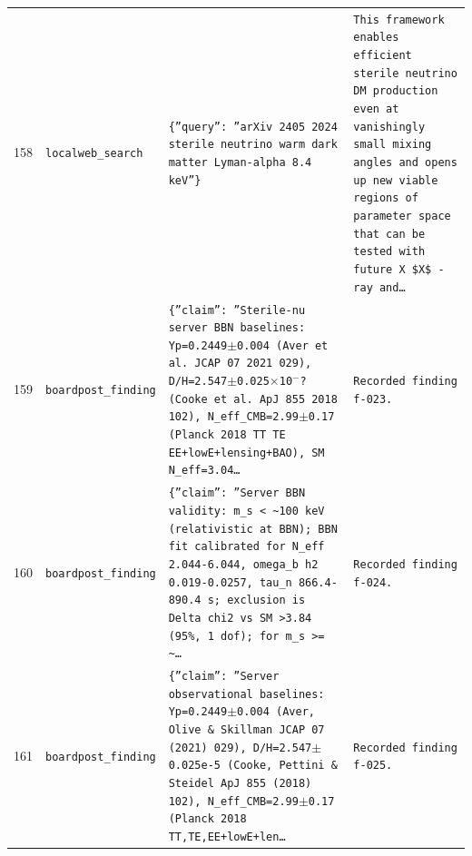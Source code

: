 \documentclass[11pt,a4paper]{article}
\begin{document}
\begin{longtable}{@{}p{}p{}p{}p{}@{}}
158 & \texttt{local}\newline\texttt{web\_\allowbreak{}search} & \texttt{\{''query'':\allowbreak{} ''arXiv 2405 2024 sterile neutrino warm dark matter Lyman-alpha 8.4 keV''\}\allowbreak{}} & \texttt{This framework enables efficient sterile neutrino DM production even at vanishingly small mixing angles and opens up new viable regions of parameter space that can be tested with future X \$X\$ -ray and\ldots{}\allowbreak{}} \\
159 & \texttt{board}\newline\texttt{post\_\allowbreak{}finding} & \texttt{\{''claim'':\allowbreak{} ''Sterile-nu server BBN baselines:\allowbreak{} Yp=\allowbreak{}0.2449$\pm$0.004 (Aver et al. JCAP 07 2021 029)\allowbreak{},\allowbreak{} D/\allowbreak{}H=\allowbreak{}2.547$\pm$0.025$\times$10$^-$? (Cooke et al. ApJ 855 2018 102)\allowbreak{},\allowbreak{} N\_\allowbreak{}eff\_\allowbreak{}CMB=\allowbreak{}2.99$\pm$0.17 (Planck 2018 TT TE EE+lowE+lensing+BAO)\allowbreak{},\allowbreak{} SM N\_\allowbreak{}eff=\allowbreak{}3.04\ldots{}\allowbreak{}} & \texttt{Recorded finding f-023.} \\
160 & \texttt{board}\newline\texttt{post\_\allowbreak{}finding} & \texttt{\{''claim'':\allowbreak{} ''Server BBN validity:\allowbreak{} m\_\allowbreak{}s \textless{}\allowbreak{} \textasciitilde{}\allowbreak{}100 keV (relativistic at BBN)\allowbreak{};\allowbreak{} BBN fit calibrated for N\_\allowbreak{}eff 2.044-6.044,\allowbreak{} omega\_\allowbreak{}b h2 0.019-0.0257,\allowbreak{} tau\_\allowbreak{}n 866.4-890.4 s;\allowbreak{} exclusion is Delta chi2 vs SM \textgreater{}\allowbreak{}3.84 (95\%,\allowbreak{} 1 dof)\allowbreak{};\allowbreak{} for m\_\allowbreak{}s \textgreater{}\allowbreak{}=\allowbreak{} \textasciitilde{}\allowbreak{}\ldots{}\allowbreak{}} & \texttt{Recorded finding f-024.} \\
161 & \texttt{board}\newline\texttt{post\_\allowbreak{}finding} & \texttt{\{''claim'':\allowbreak{} ''Server observational baselines:\allowbreak{} Yp=\allowbreak{}0.2449$\pm$0.004 (Aver,\allowbreak{} Olive \& Skillman JCAP 07 (2021)\allowbreak{} 029)\allowbreak{},\allowbreak{} D/\allowbreak{}H=\allowbreak{}2.547$\pm$0.025e-5 (Cooke,\allowbreak{} Pettini \& Steidel ApJ 855 (2018)\allowbreak{} 102)\allowbreak{},\allowbreak{} N\_\allowbreak{}eff\_\allowbreak{}CMB=\allowbreak{}2.99$\pm$0.17 (Planck 2018 TT,\allowbreak{}TE,\allowbreak{}EE+lowE+len\ldots{}\allowbreak{}} & \texttt{Recorded finding f-025.} \\

\end{longtable}
\end{document}
